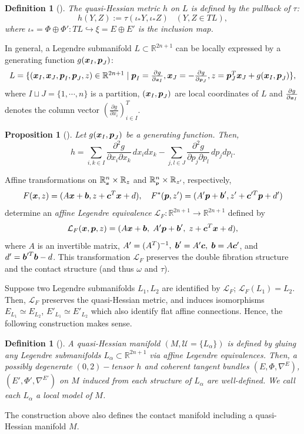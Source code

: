 \documentclass[10pt]{amsart}
\newcommand{\U}{\mathcal{U}}
\newcommand{\Lcal}{\mathcal{L}}
\newcommand{\R}{\mathbb{R}}
\def\rd{\partial}
\def\bx{\mbox{\boldmath $x$}}
\def\bb{\mbox{\boldmath $b$}}
\def\bc{\mbox{\boldmath $c$}}
\def\bp{\mbox{\boldmath $p$}}
\def\bbx{\mbox{\tiny$\bx$}}
\def\bbp{\mbox{\tiny$\bp$}}
\newtheorem{prop}[thm]{\bf Proposition}
\newtheorem{dfn}[thm]{\bf Definition}
\begin{document}
\begin{dfn}[\cite{NT}]\label{quasi-Hessian metric}\upshape
The {\em quasi-Hessian metric $h$} on $L$ is defined by the pullback of $\tau$:
$$h(Y, Z):=\tau(\iota_*Y, \iota_*Z)\;\;\;  (Y, Z \in TL),$$
where $\iota_*=\Phi\oplus \Phi': TL \hookrightarrow \xi=E\oplus E'$ is the inclusion map.
\end{dfn}

In general, a Legendre submanifold $L\subset \R^{2n+1}$ can be locally expressed by a generating function $g(\bx_I,\bp_J)$\cite{AGV}:
$$\textstyle L=\{(\bx_I,\bx_J,\bp_I,\bp_J,z)\in\R^{2n+1} \mid \bp_I= \frac{\rd g}{\rd \bbx_I},  \bx_J=- \frac{\rd g}{\rd \bbp_J}, z=\bp_J^T\bx_J+g(\bx_I, \bp_J)\},$$
where $I\sqcup J=\{1,\cdots,n\}$ is a partition, $(\bx_I,\bp_J)$ are local coordinates of $L$ and $\frac{\rd g}{\rd \bbx_I}$ denotes the column vector $(\frac{\rd g}{\rd x_i})_{i\in I}^T$.

\begin{prop}[\cite{NT}]\label{quasi-Hessian_local}\upshape
Let $g(\bx_I,\bp_J)$ be a generating function. Then, 
$$h=\sum_{i, k\in I}\frac{\rd^2 g}{\rd x_i\rd x_{k}}\,dx_idx_{k} - \sum_{j, l\in J}\frac{\rd^2 g}{\rd p_j\rd p_{l}}\,dp_jdp_{l}.$$
\end{prop}
Affine transformations on $\R^n_{\bbx}\times\R_z$ and $\R^n_{\bbp}\times\R_{z'}$, respectively, 
$$F(\bx, z)=(A\bx+ \bb,  z+\bc^T\bx+ d),\quad F^*(\bp, z')= (A'\bp+ \bb', z'+\bc'^{T}\bp+ d')$$
determine an {\em affine Legendre equivalence} $\Lcal_F : \R^{2n+1} \to \R^{2n+1}$ defined by
$$\Lcal_F (\bx, \bp, z) = (A\bx+ \bb, \;  A'\bp+ \bb', \; z+\bc^T\bx+ d),$$
where $A$ is an invertible matrix, $A'=(A^T)^{-1}, \; \bb'=A'\bc, \; \bb=A\bc'$, and $d'=\bb'^T\bb-d$.
This transformation $\Lcal_F$ preserves the double fibration structure and the contact structure (and thus $\omega$ and $\tau$).

Suppose two Legendre submanifolds $L_1, L_2$ are identified by $\Lcal_F$; $\Lcal_F(L_1)=L_2$. 
Then, $\Lcal_F$ preserves the quasi-Hessian metric, and induces isomorphisms $E_{L_1} \simeq E_{L_2}$, $E'_{L_1} \simeq E'_{L_2}$ which also identify flat affine connections.
Hence, the following construction makes sense.

\begin{dfn}[\cite{NT}]\upshape
A {\em quasi-Hessian manifold} $(M, \U=\{L_\alpha\})$ is defined by gluing any Legendre submanifolds $L_\alpha \subset \R^{2n+1}$ via affine Legendre equivalences. Then, a possibly degenerate $(0, 2)-$tensor $h$ and coherent tangent bundles $(E, \Phi, \nabla^E)$, $(E', \Phi', \nabla^{E'})$ on $M$ induced from each structure of $L_\alpha$ are well-defined. We call each $L_\alpha$ a local model of $M$.
\end{dfn}
The construction above also defines the contact manifold including a quasi-Hessian manifold $M$. 
\end{document}
